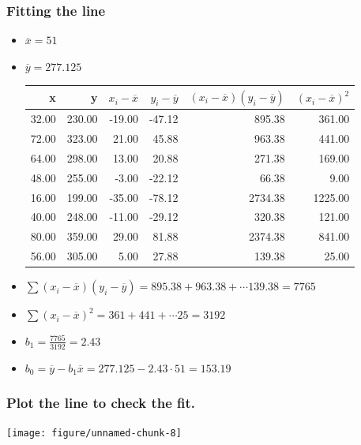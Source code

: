 \documentclass[handout]{beamer}\usepackage{graphicx, color}
\newenvironment{knitrout}{}{} %
\providecommand{\ov}[1]{\overline{#1}}
\numberwithin{equation}{section}
\begin{document}
\begin{frame}[fragile]
\frametitle{Fitting the line} \scriptsize
\begin{itemize}
\item $\ov{x} = 51$
\item $\ov{y} = 277.125$
\begin{table}[ht]
\centering
\begin{tabular}{rrrrrr}
 x & y & $x_i - \ov{x}$ & $y_i - \ov{y}$ & $(x_i - \ov{x})(y_i - \ov{y})$ & $(x_i - \ov{x})^2$ \\ 
  \hline
32.00 & 230.00 & -19.00 & -47.12 & 895.38 & 361.00 \\ 
  72.00 & 323.00 & 21.00 & 45.88 & 963.38 & 441.00 \\ 
  64.00 & 298.00 & 13.00 & 20.88 & 271.38 & 169.00 \\ 
  48.00 & 255.00 & -3.00 & -22.12 & 66.38 & 9.00 \\ 
  16.00 & 199.00 & -35.00 & -78.12 & 2734.38 & 1225.00 \\ 
  40.00 & 248.00 & -11.00 & -29.12 & 320.38 & 121.00 \\ 
  80.00 & 359.00 & 29.00 & 81.88 & 2374.38 & 841.00 \\ 
  56.00 & 305.00 & 5.00 & 27.88 & 139.38 & 25.00 \\ 
  \end{tabular}
\end{table}


\item $\sum (x_i - \ov{x})(y_i - \ov{y}) = 895.38 +  963.38  + \cdots  139.38  =  7765 $
\item $\sum (x_i - \ov{x})^2= 361 +  441  + \cdots  25  =  3192 $
\item $b_1 = \frac{7765}{3192} = 2.43$ 
\item $b_0 = \ov{y} - b_1 \ov{x} = 277.125 - 2.43 \cdot 51 = 153.19$
\end{itemize}
\end{frame}


\begin{frame}[fragile]
\frametitle{Plot the line to check the fit.} \small
\begin{center}
\begin{knitrout}
\color{fgcolor}
\texttt{[image: figure/unnamed-chunk-8]} 

\end{knitrout}


\end{center}
\end{frame}
\end{document}
